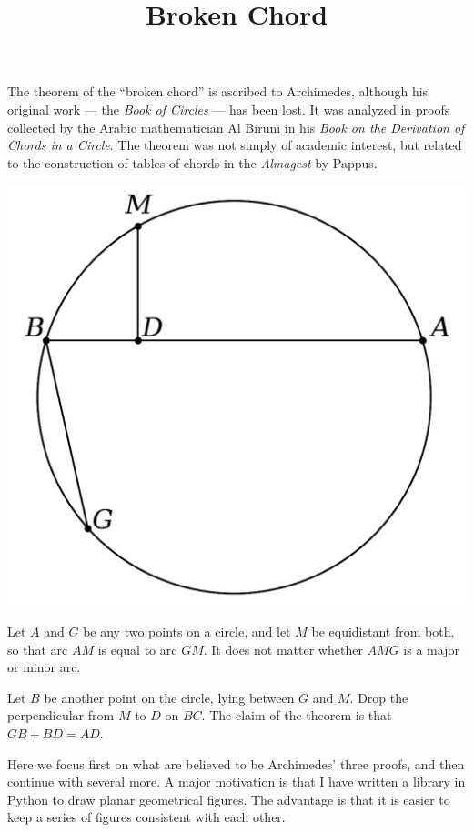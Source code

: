 \documentclass[11pt, oneside]{article}
\title{Broken Chord}
\date{}
\begin{document}
\maketitle
\Large


The theorem of the ``broken chord'' is ascribed to Archimedes, although his original work --- the \emph{Book of Circles} --- has been lost.  It was analyzed in proofs collected by the Arabic mathematician Al Biruni in his \emph{Book on the Derivation of Chords in a Circle}.  The theorem was not simply of academic interest, but related to the construction of tables of chords in the \emph{Almagest} by Pappus.

\begin{center} \includegraphics [scale=0.30] {bc00.png} \end{center}
Let $A$ and $G$ be any two points on a circle, and let $M$ be equidistant from both, so that arc $AM$ is equal to arc $GM$.  It does not matter whether $AMG$ is a major or minor arc.

Let $B$ be another point on the circle, lying between $G$ and $M$.  Drop the perpendicular from $M$ to $D$ on $BC$.  The claim of the theorem is that $GB + BD = AD$.

Here we focus first on what are believed to be Archimedes' three proofs, and then continue with several more.  A major motivation is that I have written a library in Python to draw planar geometrical figures.  The advantage is that it is easier to keep a series of figures consistent with each other.
\end{document}
